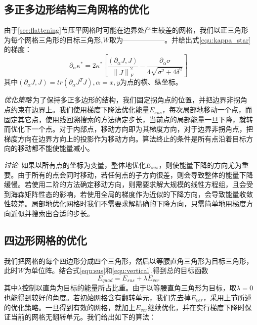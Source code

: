 \subsection{多正多边形结构三角网格的优化} \label{sec:sus-poly}
由于\ref{sec:flattening}节压平网格时可能在边界处产生较差的网格，我们以正三角形为每个网格三角形的目标三角形,$W$取为——————。并给出式\ref{equ:kappa_star}的梯度：
\begin{equation}
\partial_\alpha \kappa^*=2\kappa^*
\left[
\frac{(\partial_\alpha J,J)}{\left\|J\right\|_F^2}
-\frac{\partial_\alpha \sigma}{4\sqrt{\sigma^2+4\delta^2}}
\right]
\end{equation}
其中$(\partial_\alpha J,J)=tr(\partial_\alpha J^TJ),\alpha=x,y$为点的横、纵坐标。

\emph{优化策略}\,为了保持多正多边形的结构，我们固定拐角点的位置，并把边界非拐角点约束在边界上。我们使用梯度下降法优化能量$E_{sus}$，每次局部地移动一个点，而固定其它点，使用线回溯搜索的方法确定步长，当前点的局部能量一旦下降，就转而优化下一个点。对于内部点，移动方向即为其梯度方向，对于边界非拐角点，把梯度方向在边界方向上的投影作为移动方向。算法终止的条件是所有点沿着目标方向的移动都不能使能量减小。

\emph{讨论}\, 如果以所有点的坐标为变量，整体地优化$E_{sus}$，则使能量下降的方向尤为重要。由于所有的点会同时移动，若任何点的子方向很差，则会导致整体的能量下降缓慢。若使用二阶的方法确定移动方向，则需要求解大规模的线性方程组，且会受到海森矩阵性态的影响，若使用全局的梯度作为近似的下降方向，会导致能量收敛性较差。局部地优化网格时我们不需要求解精确的下降方向，只需简单地用梯度方向近似并搜索出合适的步长。
\subsection{四边形网格的优化}\label{sec:sus-ver-quad}
我们把网格的每个四边形分成四个三角形，然后以等腰直角三角形为目标三角形，此时$W$为单位阵。结合式\ref{equ:sus}和\ref{equ:vertical},得到总的目标函数
\begin{equation} \label{equ:quadopt}
E_{quad}=E_{sus}+\lambda E_{ver}
\end{equation}
其中$\lambda$控制以直角为目标的能量所占比重。由于以等腰直角三角形为目标，取$\lambda=0$也能得到较好的角度。若初始网格含有翻转单元，我们先去掉$E_{ver}$，采用上节所述的优化策略。一旦得到有效的网格，就加上$E_{ver}$继续优化，并在实行梯度下降时保证当前的网格无翻转单元。我们给出如下的算法：


